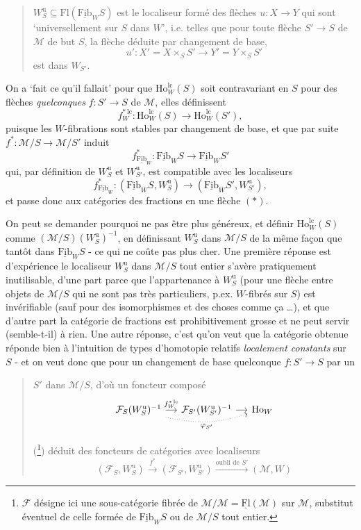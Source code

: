 \documentclass[11pt]{article}
\newcommand{\printedpage}[1]{\marginpar{\footnotesize p.~#1}}
\newcommand{\msp}[1]{\marginpar{\footnotesize [#1]}}
\newcommand{\cM}{\mathcal{M}}
\newcommand{\cF}{\mathcal{F}}
\newcommand{\Ho}{\mathrm{Ho}}
\newcommand{\Fl}{\mathrm{Fl}}
\newcommand{\Fib}{\underline{\mathrm{Fib}}}
\newcommand{\Wu}{W^{\mathrm{u}}}
\newcommand{\lc}{\mathrm{lc}}
\begin{document}
\begin{quote}
$\Wu_S \subseteq \Fl(\Fib_W S)$ est le localiseur formé des flèches $u : X \longrightarrow Y$ qui sont ‘universellement sur $S$ dans $W$’, i.e. telles que pour toute flèche $S' \longrightarrow S$ de $\cM$ de but $S$, la flèche déduite par changement de base,
\[
u' : X' = X \times_S S' \longrightarrow Y' = Y \times_S S'
\]
est dans $W_{S'}$.
\end{quote}

On a ‘fait ce qu'il fallait’ pour que $\Ho^{\lc}_W(S)$ soit contravariant en $S$ pour des flèches \textit{quelconques} $f : S' \longrightarrow S$ de $\cM$, elles définissent
\[
f^{*\,\lc}_W : \Ho^{\lc}_W(S) \longrightarrow \Ho^{\lc}_W(S'), \tag*{$(**)$}
\]
\msp{page 211}
puisque les $W$-fibrations sont stables par changement de base, et que par suite $f^* : \cM/S \longrightarrow \cM/S'$ induit
\[
f^*_{\Fib_W} : \Fib_W S \longrightarrow \Fib_W S'
\]
qui, par définition de $\Wu_S$ et $\Wu_{S'}$, est compatible avec les localiseurs
\[
f^*_{\Fib_W} : (\Fib_W S, \Wu_S) \longrightarrow (\Fib_W S', \Wu_{S'}),
\]
et passe donc aux catégories des fractions en une flèche $(*)$.

On peut se demander pourquoi ne pas être plus généreux, et définir $\Ho^{\lc}_W(S)$ comme $(\cM/S)(\Wu_S)^{-1}$, en définissant $\Wu_S$ dans $\cM/S$ de la même façon que tantôt dans $\Fib_W S$ - ce qui ne coûte pas plus cher. Une première réponse est d'expérience le localiseur $\Wu_S$ dans $\cM/S$ tout entier s'avère pratiquement inutilisable, d'une part parce que l'appartenance à $\Wu_S$ (pour une flèche entre objets de $\cM/S$ qui ne sont pas très particuliers, p.ex. $W$-fibrés sur $S$) est invérifiable (sauf pour des isomorphismes et des choses comme ça \dots), et que d'autre part la catégorie de fractions est prohibitivement
\printedpage{137}
\msp{page 212}
grosse et ne peut servir (semble-t-il) à rien. Une autre réponse, c'est qu'on veut que la catégorie obtenue réponde bien à l'intuition de types d'homotopie relatifs \textit{localement constants} sur $S$ - et on veut donc que pour un changement de base quelconque $f : S' \longrightarrow S$ par un

\begin{quote}
$S'$ dans $\cM/S$, d'où un foncteur composé
\[
\begin{tikzcd}[column sep=small]
\cF_S(\Wu_S)^{-1} \arrow[r, "f^{*\,\lc}_W"] \arrow[rr, dotted, bend right=15, "\varphi_{S'}"'] & \cF_{S'}(\Wu_{S'})^{-1} \arrow[r] & \Ho_W
\end{tikzcd}
\]

(\footnote[121]{$\cF$ désigne ici une sous-catégorie fibrée de $\cM/\cM = \underline{\Fl}(\cM)$ sur $\cM$, substitut éventuel de celle formée de $\Fib_W S$ ou de $\cM/S$ tout entier.}) déduit des foncteurs de catégories avec localiseurs
\[
(\cF_S, \Wu_S) \xrightarrow{f^*} (\cF_{S'}, \Wu_{S'}) \xrightarrow{\text{oubli de } S'} (\cM, W)
\]
\end{quote}
\end{document}
